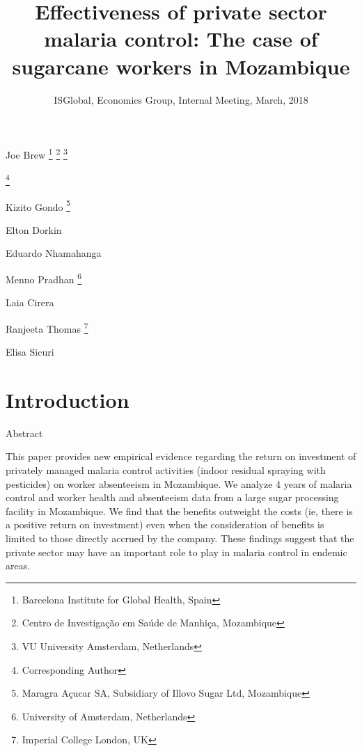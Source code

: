 \documentclass[ignorenonframetext,]{beamer}
\title{Effectiveness of private sector malaria control: The case of sugarcane
workers in Mozambique}
\subtitle{ISGlobal, Economics Group, Internal Meeting, March, 2018}
\date{}
\newcommand{\footremember}[2]{%
    \footnote{#2}
    \newcounter{#1}
    \setcounter{#1}{\value{footnote}}%
}
\newcommand{\footrecall}[1]{%
    \footnotemark[\value{#1}]%
}
\begin{document}
\frame{\titlepage}

\begin{frame}

Joe
Brew\footremember{isglobal}{Barcelona Institute for Global Health, Spain}\footremember{cism}{Centro de Investigação em Saúde de Manhiça, Mozambique}\footremember{vu}{VU University Amsterdam, Netherlands}
\footnote{Corresponding Author}

Kizito
Gondo\footremember{ma}{Maragra Açucar SA, Subsidiary of Illovo Sugar Ltd, Mozambique}

Elton Dorkin\footrecall{ma}

Eduardo Nhamahanga\footrecall{ma}

Menno
Pradhan\footrecall{vu}\footremember{uva}{University of Amsterdam, Netherlands}

Laia Cirera\footrecall{isglobal}\footrecall{cism}

Ranjeeta Thomas\footremember{icl}{Imperial College London, UK}

Elisa Sicuri\footrecall{isglobal}\footrecall{cism}\footrecall{icl}

\end{frame}

\section{Introduction}\label{introduction}

\begin{frame}{Abstract}

This paper provides new empirical evidence regarding the return on
investment of privately managed malaria control activities (indoor
residual spraying with pesticides) on worker absenteeism in Mozambique.
We analyze 4 years of malaria control and worker health and absenteeism
data from a large sugar processing facility in Mozambique. We find that
the benefits outweight the costs (ie, there is a positive return on
investment) even when the consideration of benefits is limited to those
directly accrued by the company. These findings suggest that the private
sector may have an important role to play in malaria control in endemic
areas.

\end{frame}
\end{document}
